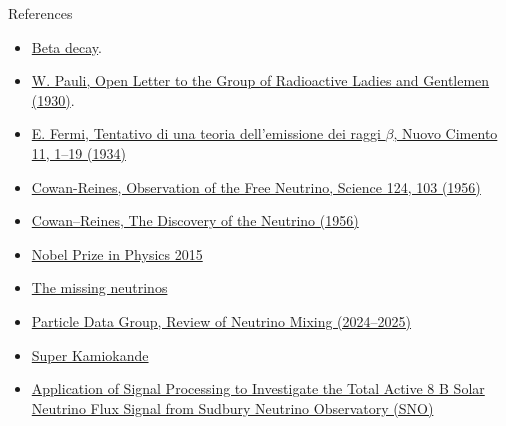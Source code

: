 \documentclass{beamer}
\begin{document}
\begin{frame}[allowframebreaks]{References}
\footnotesize
\begin{itemize}
  \item \href{https://en.wikipedia.org/wiki/Beta_decay}{Beta decay}.
  \item \href{https://www.nobelprize.org/prizes/physics/1945/pauli/lecture/}{W. Pauli, Open Letter to the Group of Radioactive Ladies and Gentlemen (1930)}.
  \item \href{https://doi.org/10.1007/BF02959820}{E. Fermi, Tentativo di una teoria dell'emissione dei raggi $\beta$, Nuovo Cimento 11, 1--19 (1934)}
  \item \href{https://doi.org/10.1126/science.124.3212.103}{Cowan-Reines, Observation of the Free Neutrino, Science 124, 103 (1956)}
  \item \href{https://radioactivity.eu.com/articles/phenomenon/1956-neutrino-discovery}{Cowan--Reines, The Discovery of the Neutrino (1956)}
  \item \href{https://www.nobelprize.org/prizes/physics/2015}{Nobel Prize in Physics 2015}
  \item \href{https://universe-review.ca/R15-13-neutrino.htm}{The missing neutrinos}
  \item \href{https://pdg.lbl.gov/2024/reviews/rpp2024-rev-neutrino-mixing.pdf}{Particle Data Group, Review of Neutrino Mixing (2024--2025)}
  \item \href{https://www-sk.icrr.u-tokyo.ac.jp/en/sk/about/detector/}{Super Kamiokande}
  \item \href{https://www.researchgate.net/publication/232770047_Application_of_Signal_Processing_to_Investigate_the_Total_Active_8_B_Solar_Neutrino_Flux_Signal_from_Sudbury_Neutrino_Observatory_SNO}{Application of Signal Processing to Investigate the Total Active 8 B Solar Neutrino Flux Signal from Sudbury Neutrino Observatory (SNO)}
\end{itemize}
\end{frame}
\end{document}
